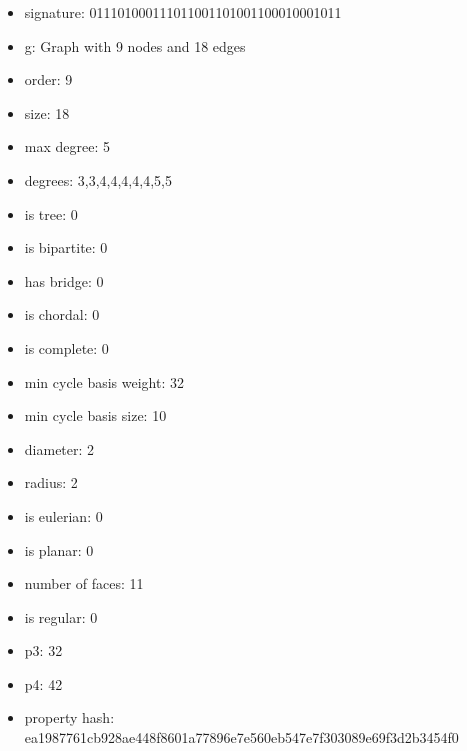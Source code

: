 \newpage
\begin{figure}
\end{figure}
\begin{itemize}
\item signature: 011101000111011001101001100010001011
\item g: Graph with 9 nodes and 18 edges
\item order: 9
\item size: 18
\item max degree: 5
\item degrees: 3,3,4,4,4,4,4,5,5
\item is tree: 0
\item is bipartite: 0
\item has bridge: 0
\item is chordal: 0
\item is complete: 0
\item min cycle basis weight: 32
\item min cycle basis size: 10
\item diameter: 2
\item radius: 2
\item is eulerian: 0
\item is planar: 0
\item number of faces: 11
\item is regular: 0
\item p3: 32
\item p4: 42
\item property hash: ea1987761cb928ae448f8601a77896e7e560eb547e7f303089e69f3d2b3454f0
\end{itemize}
